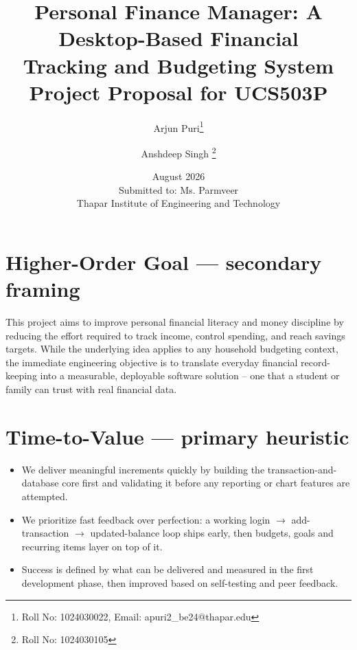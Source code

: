 \documentclass{article}
\title{Personal Finance Manager: A Desktop-Based Financial\\ Tracking and Budgeting System \\ \large Project Proposal for UCS503P}
\author{
  Arjun Puri\thanks{Roll No: 1024030022, Email: apuri2\_be24@thapar.edu} \and
  Anshdeep Singh \thanks{Roll No: 1024030105}
}
\date{August 2026 \\ \small Submitted to: Ms. Parmveer  \\ Thapar Institute of Engineering and Technology}
\begin{document}
\maketitle

\section{Higher-Order Goal --- secondary framing}
This project aims to improve personal financial literacy and money discipline by reducing the effort required to track income, control spending, and reach savings targets. While the underlying idea applies to any household budgeting context, the immediate engineering objective is to translate everyday financial record-keeping into a measurable, deployable software solution -- one that a student or family can trust with real financial data.

\section{Time-to-Value --- primary heuristic}
\begin{itemize}[noitemsep]
  \item We deliver meaningful increments quickly by building the transaction-and-database core first and validating it before any reporting or chart features are attempted.
  \item We prioritize fast feedback over perfection: a working login $\rightarrow$ add-transaction $\rightarrow$ updated-balance loop ships early, then budgets, goals and recurring items layer on top of it.
  \item Success is defined by what can be delivered and measured in the first development phase, then improved based on self-testing and peer feedback.
\end{itemize}
\end{document}
